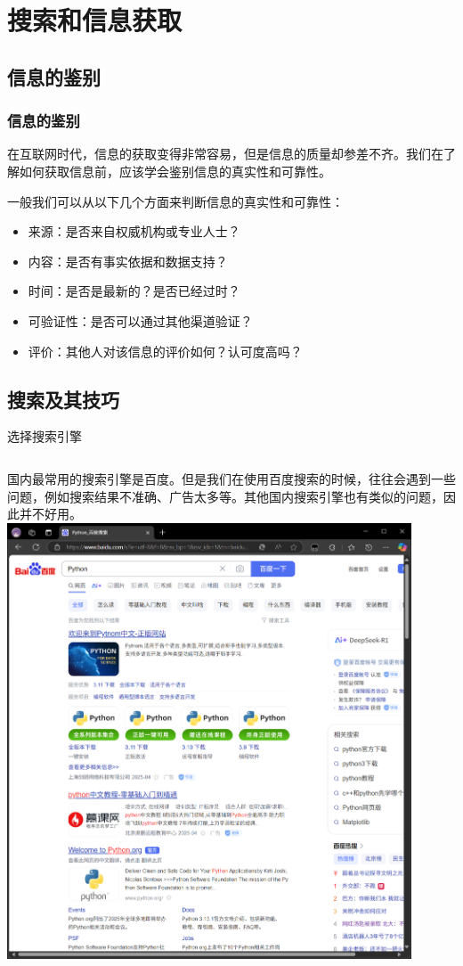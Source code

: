 \documentclass{beamer}
\begin{document}
\section{搜索和信息获取}

\subsection{信息的鉴别}
\begin{frame}
    \frametitle{信息的鉴别}
    在互联网时代，信息的获取变得非常容易，但是信息的质量却参差不齐。我们在了解如何获取信息前，应该学会鉴别信息的真实性和可靠性。

    一般我们可以从以下几个方面来判断信息的真实性和可靠性：
    \begin{itemize}
        \item <2->来源：是否来自权威机构或专业人士？
        \item <3->内容：是否有事实依据和数据支持？
        \item <4->时间：是否是最新的？是否已经过时？
        \item <5->可验证性：是否可以通过其他渠道验证？
        \item <6->评价：其他人对该信息的评价如何？认可度高吗？
    \end{itemize}
\end{frame}

\subsection{搜索及其技巧}

\begin{frame}{选择搜索引擎}
    \begin{columns}[T]
            国内最常用的搜索引擎是百度。但是我们在使用百度搜索的时候，往往会遇到一些问题，例如搜索结果不准确、广告太多等。其他国内搜索引擎也有类似的问题，因此并不好用。
            \includegraphics[width=0.9\textwidth]{4-1-Baidu.png}
    \end{columns}
\end{frame}
\end{document}
